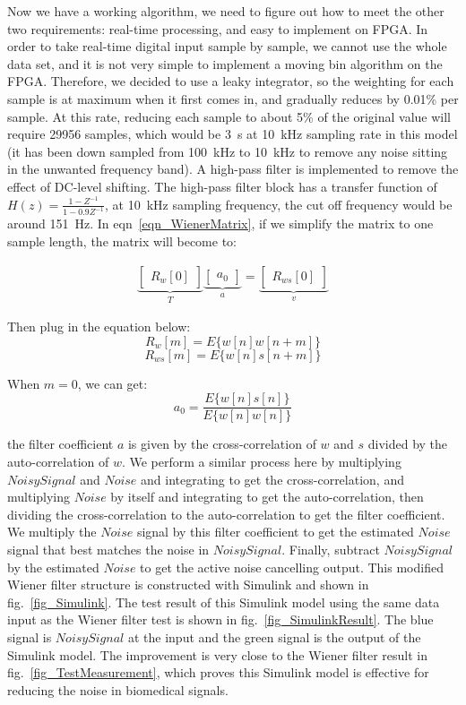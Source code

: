 Now we have a working algorithm, we need to figure out how to meet the other two requirements: real-time processing, and easy to implement on FPGA.  In order to take real-time digital input sample by sample, we cannot use the whole data set, and it is not very simple to implement a moving bin algorithm on the FPGA.  Therefore, we decided to use a leaky integrator, so the weighting for each sample is at maximum when it first comes in, and gradually reduces by 0.01\% per sample.  At this rate, reducing each sample to about 5\% of the original value will require 29956 samples, which would be \qty{3}{s} at \qty{10}{kHz} sampling rate in this model (it has been down sampled from \qty{100}{kHz} to \qty{10}{kHz} to remove any noise sitting in the unwanted frequency band).  A high-pass filter is implemented to remove the effect of DC-level shifting.  The high-pass filter block has a transfer function of $H(z)=\frac{1-Z^{-1}}{1-0.9Z^{-1}}$, at \qty{10}{kHz} sampling frequency, the cut off frequency would be around \qty{151}{Hz}.  In eqn~\ref{eqn_WienerMatrix}, if we simplify the matrix to one sample length, the matrix will become to:

\begin{gather} \label{eqn_WienerMatrix_3}
\underbrace{
    \begin{bmatrix}
    R_w[0]
    \end{bmatrix}
}_{T}
\underbrace{
    \begin{bmatrix}
    a_0
    \end{bmatrix}
}_{a}
=
\underbrace{
    \begin{bmatrix}
    R_{ws}[0]
    \end{bmatrix}
}_{v}
\end{gather}

Then plug in the equation below:
$$R_w[m]=E\{w[n]w[n+m]\}$$
$$R_{ws}[m]=E\{w[n]s[n+m]\}$$

When $m=0$, we can get:
$$a_0 = \frac{E\{w[n]s[n]\}}{E\{w[n]w[n]\}}$$

the filter coefficient $a$ is given by the cross-correlation of $w$ and $s$ divided by the auto-correlation of $w$.  We perform a similar process here by multiplying $NoisySignal$ and $Noise$ and integrating to get the cross-correlation, and multiplying $Noise$ by itself and integrating to get the auto-correlation, then dividing the cross-correlation to the auto-correlation to get the filter coefficient.  We multiply the $Noise$ signal by this filter coefficient to get the estimated $Noise$ signal that best matches the noise in $NoisySignal$.  Finally, subtract $NoisySignal$ by the estimated $Noise$ to get the active noise cancelling output.  This modified Wiener filter structure is constructed with Simulink and shown in fig.~\ref{fig_Simulink}.  The test result of this Simulink model using the same data input as the Wiener filter test is shown in fig.~\ref{fig_SimulinkResult}.  The blue signal is $NoisySignal$ at the input and the green signal is the output of the Simulink model.  The improvement is very close to the Wiener filter result in fig.~\ref{fig_TestMeasurement}, which proves this Simulink model is effective for reducing the noise in biomedical signals.

